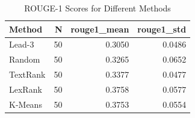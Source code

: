 \begin{table}
\caption{ROUGE-1 Scores for Different Methods}
\label{tab:results}
\begin{tabular}{lrrr}
\toprule
Method & N & rouge1_mean & rouge1_std \\
\midrule
Lead-3 & 50 & 0.3050 & 0.0486 \\
Random & 50 & 0.3265 & 0.0652 \\
TextRank & 50 & 0.3377 & 0.0477 \\
LexRank & 50 & 0.3758 & 0.0577 \\
K-Means & 50 & 0.3753 & 0.0554 \\
\bottomrule
\end{tabular}
\end{table}
